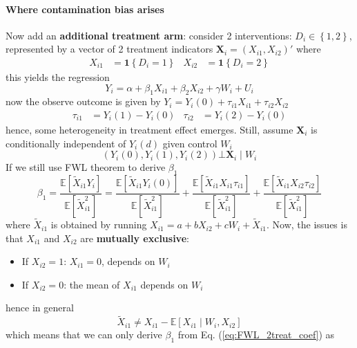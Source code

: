 \documentclass[twoside]{article}
\begin{document}
\paragraph*{Where contamination bias arises} Now add an \textbf{additional treatment arm}: consider 2  interventions: $D_i \in \left\{1,2\right\}$, represented by a vector of 2 treatment indicators $\mathbf{X}_i = \left(X_{i1},X_{i2}\right)'$ where 
\begin{align*}
    X_{i1}&=\mathbf{1}\left\{D_i=1\right\} & X_{i2}&=\mathbf{1}\left\{D_i=2\right\}
\end{align*}
this yields the regression 
\begin{equation}\label{eq:example_2treatment}
    Y_i = \alpha + \beta_1 X_{i1} + \beta_2 X_{i2} + \gamma W_i + U_i
\end{equation}
now the observe outcome is given by $Y_i = Y_i(0) +\tau_{i1}X_{i1}+ \tau_{i2}X_{i2}$
\begin{align*}
    \tau_{i1} &= Y_i(1)- Y_i(0) & \tau_{i2} &= Y_i(2)-Y_i(0)
\end{align*}
hence, some heterogeneity in treatment effect emerges. Still, assume $\mathbf{X}_i$ is conditionally independent of $Y_i(d)$ given control $W_i$
$$
\left( Y_i(0),Y_i(1),Y_i(2) \right) \bot \mathbf{X}_i \mid W_i
$$
If we still use FWL theorem to derive $\beta_1$
\begin{equation}\label{eq:FWL_2treat_coef}
    \beta_1 = \frac{\mathbb{E}\left[ \tilde{X}_{i1}Y_i \right]}{\mathbb{E}\left[ \tilde{X}^2_{i1} \right]} = \frac{\mathbb{E}\left[ \tilde{X}_{i1}Y_i(0) \right]}{\mathbb{E}\left[ \tilde{X}^2_{i1} \right]} + \frac{\mathbb{E}\left[ \tilde{X}_{i1} X_{i1}\tau_{i1} \right]}{\mathbb{E}\left[ \tilde{X}^2_{i1} \right]} + \frac{\mathbb{E}\left[ \tilde{X}_{i1} X_{i2}\tau_{i2} \right]}{\mathbb{E}\left[ \tilde{X}^2_{i1} \right]}
\end{equation}
where $\tilde{X}_{i1}$ is obtained by running $X_{i1} = a+bX_{i2}+cW_i +\tilde{X}_{i1}$. Now, the issues is that $X_{i1}$ and $X_{i2}$ are \textbf{mutually exclusive}:
\begin{itemize}
    \item If $X_{i2} = 1$: $X_{i1}=0$,  depends on $W_i$
    \item If $X_{i2} = 0$: the mean of $X_{i1}$ depends on $W_i$
\end{itemize}
hence in general
$$
\tilde{X}_{i1} \neq X_{i1} - \mathbb{E}\left[ X_{i1}\mid W_i,X_{i2} \right]
$$
which means that we can only derive $\beta_1$ from Eq. (\ref{eq:FWL_2treat_coef}) as 
\end{document}
